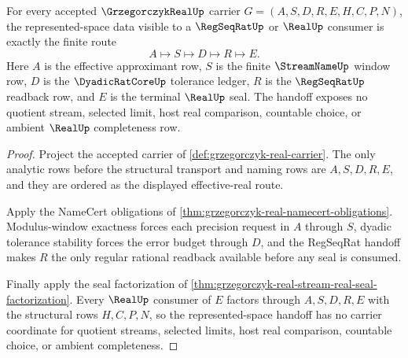 \begin{theorem}
\label{thm:grzegorczyk-real-representation-regseqrat-handoff}
For every accepted $\GrzegorczykRealUp$ carrier $G=(A,S,D,R,E,H,C,P,N)$, the represented-space data visible to a $\RegSeqRatUp$ or $\RealUp$ consumer is exactly the finite route
$$
A\longmapsto S\longmapsto D\longmapsto R\longmapsto E .
$$
Here $A$ is the effective approximant row, $S$ is the finite $\StreamNameUp$ window row, $D$ is the $\DyadicRatCoreUp$ tolerance ledger, $R$ is the $\RegSeqRatUp$ readback row, and $E$ is the terminal $\RealUp$ seal. The handoff exposes no quotient stream, selected limit, host real comparison, countable choice, or ambient $\RealUp$ completeness row.
\end{theorem}
\begin{proof}
Project the accepted carrier of \autoref{def:grzegorczyk-real-carrier}. The only analytic rows before the structural transport and naming rows are $A,S,D,R,E$, and they are ordered as the displayed effective-real route.

Apply the NameCert obligations of \autoref{thm:grzegorczyk-real-namecert-obligations}. Modulus-window exactness forces each precision request in $A$ through $S$, dyadic tolerance stability forces the error budget through $D$, and the RegSeqRat handoff makes $R$ the only regular rational readback available before any seal is consumed.

Finally apply the seal factorization of \autoref{thm:grzegorczyk-real-stream-real-seal-factorization}. Every $\RealUp$ consumer of $E$ factors through $A,S,D,R,E$ with the structural rows $H,C,P,N$, so the represented-space handoff has no carrier coordinate for quotient streams, selected limits, host real comparison, countable choice, or ambient completeness.
\end{proof}



